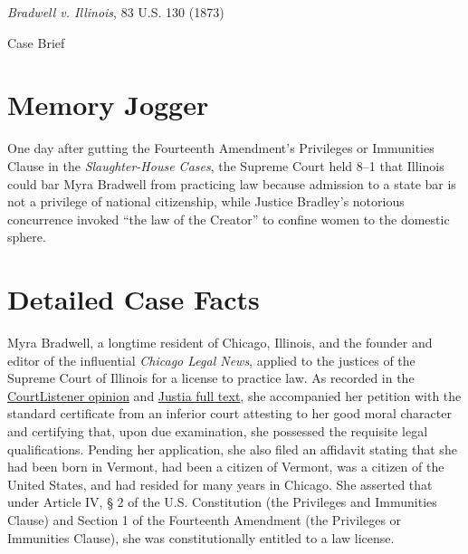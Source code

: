 \documentclass[12pt]{article}
\begin{document}
\begin{center}
{\LARGE \textit{Bradwell v. Illinois}, 83 U.S. 130 (1873)\par}
\vspace{0.8em}
{\large Case Brief\par}
\end{center}
\vspace{1em}

\section{Memory Jogger}

One day after gutting the Fourteenth Amendment's Privileges or Immunities Clause in the \textit{Slaughter-House Cases}, the Supreme Court held 8--1 that Illinois could bar Myra Bradwell from practicing law because admission to a state bar is not a privilege of national citizenship, while Justice Bradley's notorious concurrence invoked ``the law of the Creator'' to confine women to the domestic sphere.

\section{Detailed Case Facts}

Myra Bradwell, a longtime resident of Chicago, Illinois, and the founder and editor of the influential \textit{Chicago Legal News}, applied to the justices of the Supreme Court of Illinois for a license to practice law. As recorded in the \href{https://www.courtlistener.com/opinion/88662/bradwell-v-state/}{CourtListener opinion} and \href{https://supreme.justia.com/cases/federal/us/83/130/}{Justia full text}, she accompanied her petition with the standard certificate from an inferior court attesting to her good moral character and certifying that, upon due examination, she possessed the requisite legal qualifications. Pending her application, she also filed an affidavit stating that she had been born in Vermont, had been a citizen of Vermont, was a citizen of the United States, and had resided for many years in Chicago. She asserted that under Article IV, \S{} 2 of the U.S. Constitution (the Privileges and Immunities Clause) and Section 1 of the Fourteenth Amendment (the Privileges or Immunities Clause), she was constitutionally entitled to a law license.
\end{document}
